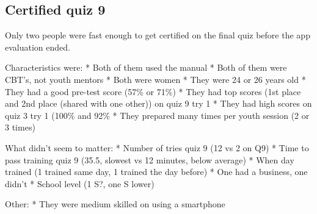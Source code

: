\subsection{Certified quiz 9}
Only two people were fast enough to get certified on the final quiz before the app evaluation ended.

Characteristics were:
* Both of them used the manual
* Both of them were CBT's, not youth mentors
* Both were women
* They were 24 or 26 years old
* They had a good pre-test score (57\% or 71\%)
* They had top scores (1st place and 2nd place (shared with one other)) on quiz 9 try 1
* They had high scores on quiz 3 try 1 (100\% and 92\%
* They prepared many times per youth session (2 or 3 times)

What didn't seem to matter:
* Number of tries quiz 9 (12 vs 2 on Q9)
* Time to pass training quiz 9 (35.5, slowest vs 12 minutes, below average)
* When day trained (1 trained same day, 1 trained the day before)
* One had a business, one didn't
* School level (1 S?, one S lower)

Other:
* They were medium skilled on using a smartphone
